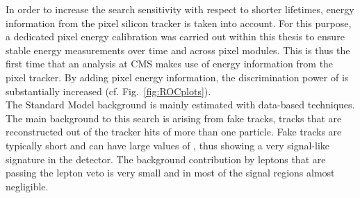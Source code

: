 In order to increase the search sensitivity with respect to shorter lifetimes, energy information from the pixel silicon tracker is taken into account.
For this purpose, a dedicated pixel energy calibration was carried out within this thesis to ensure stable energy measurements over time and across pixel modules.
This is thus the first time that an analysis at CMS makes use of energy information from the pixel tracker.
By adding pixel energy information, the discrimination power of \dedx is substantially increased (cf. Fig.~\ref{fig:ROCplots}).\\

The Standard Model background is mainly estimated with data-based techniques.
The main background to this search is arising from fake tracks, \ie tracks that are reconstructed out of the tracker hits of more than one particle.
Fake tracks are typically short and can have large values of \ias, thus showing a very signal-like signature in the detector.
The background contribution by leptons that are passing the lepton veto is very small and in most of the signal regions almost negligible.

